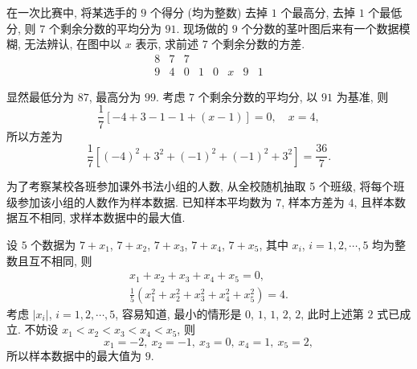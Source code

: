 \begin{exercise}
    在一次比赛中, 将某选手的 $9$ 个得分 (均为整数) 去掉 $1$ 个最高分, 去掉 $1$ 个最低分, 则 $7$ 个剩余分数的平均分为 $91$. 现场做的 $9$ 个分数的茎叶图后来有一个数据模糊, 无法辨认, 在图中以 $x$ 表示, 求前述 7 个剩余分数的方差.
    \[\begin{array}{c|ccccccc}
      8 & 7 & 7 & &&&&\\
      9 & 4 & 0 & 1 & 0 & x & 9 & 1
    \end{array}\]
\end{exercise}
\beginsolution
    显然最低分为 $87$, 最高分为 $99$. 考虑 $7$ 个剩余分数的平均分, 以 $91$ 为基准, 则
    \[\frac17[-4+3-1-1+(x-1)]= 0,\quad x= 4,\]
    所以方差为
    \[\frac17[(-4)^2+3^2+(-1)^2+(-1)^2+3^2]= \frac{36}{7}.\]
\endsolution

\begin{exercise}
    为了考察某校各班参加课外书法小组的人数, 从全校随机抽取 5 个班级, 将每个班级参加该小组的人数作为样本数据. 已知样本平均数为 $7$, 样本方差为 $4$, 且样本数据互不相同, 求样本数据中的最大值.
\end{exercise}
\beginsolution
    设 $5$ 个数据为 $7+x_1$, $7+x_2$, $7+x_3$, $7+x_4$, $7+x_5$, 其中 $x_i$, $i=1,2,\cdots,5$ 均为整数且互不相同, 则
    \[\begin{gathered}
        x_1+x_2+x_3+x_4+x_5= 0,\\
        \frac{1}{5}(x_1^2+x_2^2+x_3^2+x_4^2+x_5^2)= 4.
    \end{gathered}\]
    考虑 $|x_i|$, $i=1,2,\cdots,5$, 容易知道, 最小的情形是 $0$, $1$, $1$, $2$, $2$, 此时上述第 $2$ 式已成立. 不妨设 $x_1<x_2<x_3<x_4<x_5$, 则
    \[x_1= -2,\ x_2= -1,\ x_3= 0,\ x_4=1,\ x_5=2,\]
    所以样本数据中的最大值为 $9$.
\endsolution


